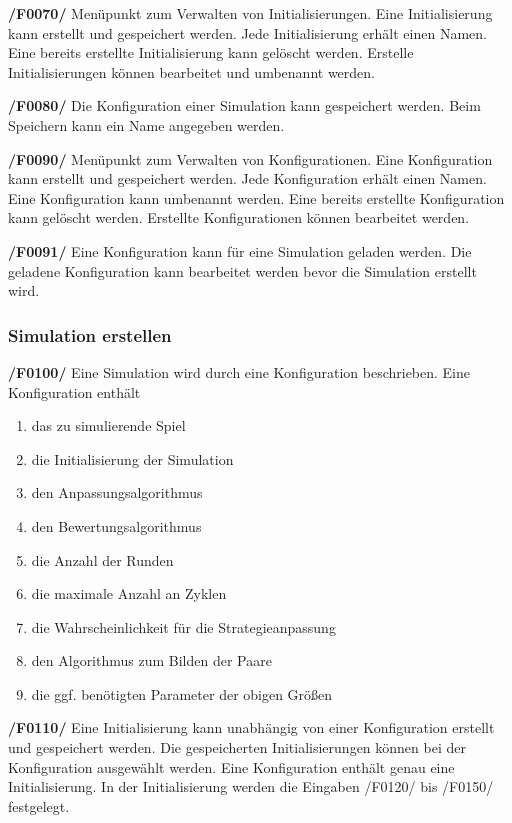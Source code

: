 \textbf{/F0070/}
Menüpunkt zum Verwalten von Initialisierungen. Eine Initialisierung kann erstellt und gespeichert werden. Jede Initialisierung  erhält einen Namen. Eine bereits erstellte Initialisierung kann gelöscht werden. Erstelle Initialisierungen können bearbeitet und umbenannt werden.

\textbf{/F0080/}
Die Konfiguration einer Simulation kann gespeichert werden. Beim Speichern kann ein Name angegeben werden.

\textbf{/F0090/}
Menüpunkt zum Verwalten von Konfigurationen. Eine Konfiguration kann erstellt und gespeichert werden. Jede Konfiguration erhält einen Namen. Eine Konfiguration kann umbenannt werden. Eine bereits erstellte Konfiguration kann gelöscht werden. Erstellte Konfigurationen können bearbeitet werden.

\textbf{/F0091/}
Eine Konfiguration kann für eine Simulation geladen werden. Die geladene Konfiguration kann bearbeitet werden bevor die Simulation erstellt wird.

\subsubsection{Simulation erstellen}

\textbf{/F0100/}
Eine Simulation wird durch eine Konfiguration beschrieben. Eine Konfiguration enthält
\begin{enumerate}
\item das zu simulierende Spiel
\item die Initialisierung der Simulation
\item den Anpassungsalgorithmus 
\item den Bewertungsalgorithmus
\item die Anzahl der Runden
\item die maximale Anzahl an Zyklen
\item die Wahrscheinlichkeit für die Strategieanpassung
\item den Algorithmus zum Bilden der Paare
\item {\color{red}die ggf. benötigten Parameter der obigen Größen}
\end{enumerate}

\textbf{/F0110/}
Eine Initialisierung kann unabhängig von einer Konfiguration erstellt und gespeichert werden. Die gespeicherten Initialisierungen können bei der Konfiguration ausgewählt werden. Eine Konfiguration enthält genau eine Initialisierung. In der Initialisierung werden die Eingaben /F0120/ bis /F0150/ festgelegt.

